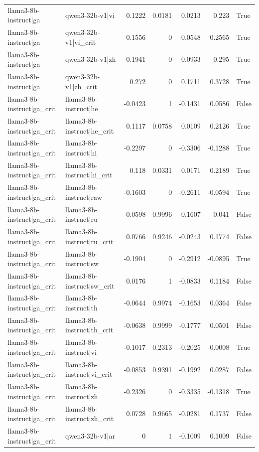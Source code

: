 \begin{table}
\begin{tabular}{l l r r r r l}
llama3-8b-instruct|ga & qwen3-32b-v1|vi & 0.1222 & 0.0181 & 0.0213 & 0.223 & True \\
llama3-8b-instruct|ga & qwen3-32b-v1|vi_crit & 0.1556 & 0 & 0.0548 & 0.2565 & True \\
llama3-8b-instruct|ga & qwen3-32b-v1|zh & 0.1941 & 0 & 0.0933 & 0.295 & True \\
llama3-8b-instruct|ga & qwen3-32b-v1|zh_crit & 0.272 & 0 & 0.1711 & 0.3728 & True \\
llama3-8b-instruct|ga_crit & llama3-8b-instruct|he & -0.0423 & 1 & -0.1431 & 0.0586 & False \\
llama3-8b-instruct|ga_crit & llama3-8b-instruct|he_crit & 0.1117 & 0.0758 & 0.0109 & 0.2126 & True \\
llama3-8b-instruct|ga_crit & llama3-8b-instruct|hi & -0.2297 & 0 & -0.3306 & -0.1288 & True \\
llama3-8b-instruct|ga_crit & llama3-8b-instruct|hi_crit & 0.118 & 0.0331 & 0.0171 & 0.2189 & True \\
llama3-8b-instruct|ga_crit & llama3-8b-instruct|raw & -0.1603 & 0 & -0.2611 & -0.0594 & True \\
llama3-8b-instruct|ga_crit & llama3-8b-instruct|ru & -0.0598 & 0.9996 & -0.1607 & 0.041 & False \\
llama3-8b-instruct|ga_crit & llama3-8b-instruct|ru_crit & 0.0766 & 0.9246 & -0.0243 & 0.1774 & False \\
llama3-8b-instruct|ga_crit & llama3-8b-instruct|sw & -0.1904 & 0 & -0.2912 & -0.0895 & True \\
llama3-8b-instruct|ga_crit & llama3-8b-instruct|sw_crit & 0.0176 & 1 & -0.0833 & 0.1184 & False \\
llama3-8b-instruct|ga_crit & llama3-8b-instruct|th & -0.0644 & 0.9974 & -0.1653 & 0.0364 & False \\
llama3-8b-instruct|ga_crit & llama3-8b-instruct|th_crit & -0.0638 & 0.9999 & -0.1777 & 0.0501 & False \\
llama3-8b-instruct|ga_crit & llama3-8b-instruct|vi & -0.1017 & 0.2313 & -0.2025 & -0.0008 & True \\
llama3-8b-instruct|ga_crit & llama3-8b-instruct|vi_crit & -0.0853 & 0.9391 & -0.1992 & 0.0287 & False \\
llama3-8b-instruct|ga_crit & llama3-8b-instruct|zh & -0.2326 & 0 & -0.3335 & -0.1318 & True \\
llama3-8b-instruct|ga_crit & llama3-8b-instruct|zh_crit & 0.0728 & 0.9665 & -0.0281 & 0.1737 & False \\
llama3-8b-instruct|ga_crit & qwen3-32b-v1|ar & 0 & 1 & -0.1009 & 0.1009 & False \\

\end{tabular}
\end{table}
